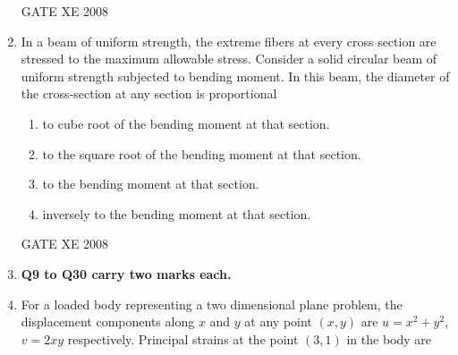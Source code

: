 \documentclass[12pt]{article}
\begin{document}
\begin{enumerate}
\begin{enumerate}
\end{enumerate}

GATE XE 2008

\item In a beam of uniform strength, the extreme fibers at every cross section are stressed to the maximum allowable stress. Consider a solid circular beam of uniform strength subjected to bending moment. In this beam, the diameter of the cross-section at any section is proportional  

\begin{enumerate}
\item  to cube root of the bending moment at that section. 
\item  to the square root of the bending moment at that section.  
\item  to the bending moment at that section.  
\item  inversely to the bending moment at that section. 
\end{enumerate}

GATE XE 2008

\item[] \textbf{Q9 to Q30 carry two marks each.}


\item For a loaded body representing a two dimensional plane problem, the displacement components along $x$ and $y$ at any point $(x, y)$ are $u = x^2 + y^2$, $v = 2xy$ respectively. Principal strains at the point $(3, 1)$ in the body are 

\begin{enumerate}
\end{enumerate}


\end{enumerate}
\end{document}
